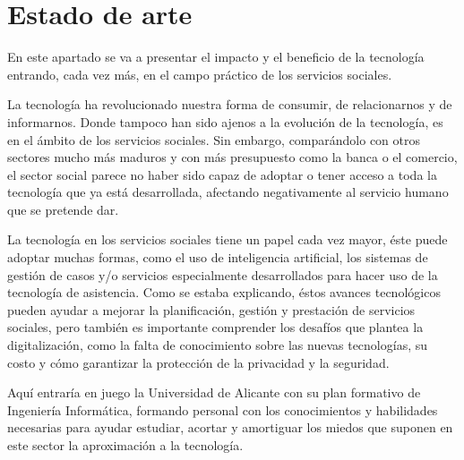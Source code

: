 
\chapter{Estado de arte}
En este apartado se va a presentar el impacto y el beneficio de la tecnología entrando, cada vez más, en el campo práctico de los servicios sociales.
\vspace{1em}
\par La tecnología ha revolucionado nuestra forma de consumir, de relacionarnos y de informarnos. Donde tampoco han sido ajenos a la evolución de la tecnología, es en el ámbito de los servicios sociales. Sin embargo, comparándolo con otros sectores mucho más maduros y con más presupuesto como la banca o el comercio, el sector social parece no haber sido capaz de adoptar o tener acceso a toda la tecnología que ya está desarrollada, afectando negativamente al servicio humano que se pretende dar.
\vspace{1em}
\par La tecnología en los servicios sociales tiene un papel cada vez mayor, éste puede adoptar muchas formas, como el uso de inteligencia artificial, los sistemas de gestión de casos y/o servicios especialmente desarrollados para hacer uso de la tecnología de asistencia. Como se estaba explicando, éstos avances tecnológicos pueden ayudar a mejorar la planificación, gestión y prestación de servicios sociales, pero también es importante comprender los desafíos que plantea la digitalización, como la falta de conocimiento sobre las nuevas tecnologías, su costo y cómo garantizar la protección de la privacidad y la seguridad.
\vspace{1em}
\par Aquí entraría en juego la Universidad de Alicante con su plan formativo de Ingeniería Informática, formando personal con los conocimientos y habilidades necesarias para ayudar estudiar, acortar y amortiguar los miedos que suponen en este sector la aproximación a la tecnología.
\clearpage
